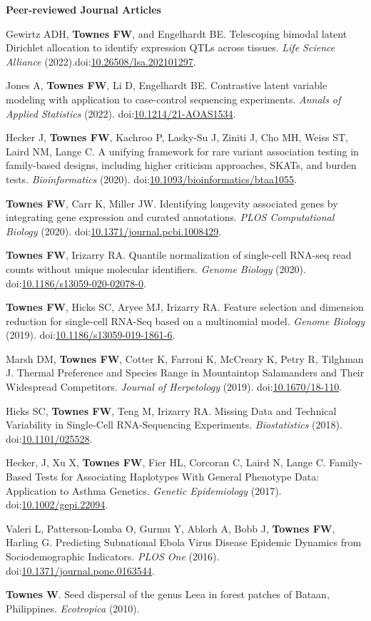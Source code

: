 \documentclass[10pt]{article}
\newcommand\doilink[1]{\href{https://dx.doi.org/#1}{#1}}
\newcommand\doi[1]{doi:\doilink{#1}}
\begin{document}
\textbf{Peer-reviewed Journal Articles}
\begin{enumerate}[label= {[\arabic*]}]
\item Gewirtz ADH, {\bf Townes FW}, and Engelhardt BE. Telescoping bimodal latent Dirichlet allocation to identify expression QTLs across tissues. {\it Life Science Alliance} (2022).\newline \doi{10.26508/lsa.202101297}.
\item Jones A, {\bf Townes FW}, Li D, Engelhardt BE. Contrastive latent variable modeling with application to case-control sequencing experiments. {\it Annals of Applied Statistics} (2022). \newline \doi{10.1214/21-AOAS1534}.
\item Hecker J, {\bf Townes FW}, Kachroo P, Lasky-Su J, Ziniti J, Cho MH, Weiss ST, Laird NM, Lange C. A unifying framework for rare variant association testing in family-based designs, including higher criticism approaches, SKATs, and burden tests. {\it Bioinformatics} (2020). \newline \doi{10.1093/bioinformatics/btaa1055}.
\item {\bf Townes FW}, Carr K, Miller JW. Identifying longevity associated genes by integrating gene expression and curated annotations. {\it PLOS Computational Biology} (2020). \newline \doi{10.1371/journal.pcbi.1008429}.
\item {\bf Townes FW}, Irizarry RA. Quantile normalization of single-cell RNA-seq read counts without unique molecular identifiers. {\it Genome Biology} (2020). \doi{10.1186/s13059-020-02078-0}.
\item {\bf Townes FW}, Hicks SC, Aryee MJ, Irizarry RA. Feature selection and dimension reduction for single-cell RNA-Seq based on a multinomial model. {\it Genome Biology} (2019). \doi{10.1186/s13059-019-1861-6}.
\item Marsh DM, {\bf Townes FW}, Cotter K, Farroni K, McCreary K, Petry R, Tilghman J. Thermal Preference and Species Range in Mountaintop Salamanders and Their Widespread Competitors. {\it Journal of Herpetology} (2019). \doi{10.1670/18-110}.
\item Hicks SC, {\bf Townes FW}, Teng M, Irizarry RA. Missing Data and Technical Variability in Single-Cell RNA-Sequencing Experiments. {\it Biostatistics} (2018). \doi{10.1101/025528}.
\item Hecker, J, Xu X, {\bf Townes FW}, Fier HL, Corcoran C, Laird N, Lange C. Family-Based Tests for Associating Haplotypes With General Phenotype Data: Application to Asthma Genetics. {\it Genetic Epidemiology} (2017). \doi{10.1002/gepi.22094}.
\item Valeri L, Patterson-Lomba O, Gurmu Y, Ablorh A, Bobb J, {\bf Townes FW}, Harling G. Predicting Subnational Ebola Virus Disease Epidemic Dynamics from Sociodemographic Indicators. {\it PLOS One} (2016). \doi{10.1371/journal.pone.0163544}.
\item {\bf Townes W}. Seed dispersal of the genus Leea in forest patches of Bataan, Philippines. {\it Ecotropica } (2010).
\end{enumerate}
\end{document}

